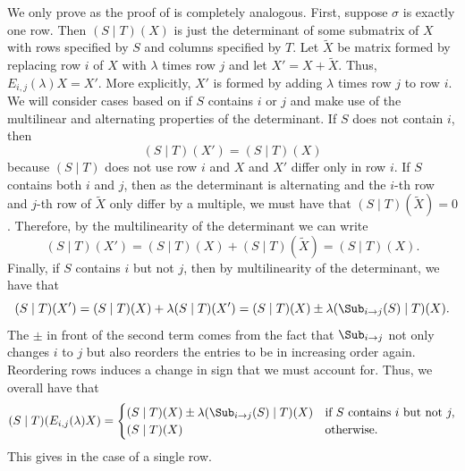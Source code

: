 \documentclass[letterpaper, 11pt]{amsart}
\begin{document}
\begin{pf}
    We only prove  as the proof of  is completely analogous.
    First, suppose $\sigma$ is exactly one row.
    Then $(S \mid T)(X)$ is just the determinant of some submatrix of $X$ with rows specified by $S$ and columns specified by $T$.
    Let $\widetilde{X}$ be matrix formed by replacing row $i$ of $X$ with $\lambda$ times row $j$ and let $X' = X + \widetilde{X}$.
    Thus, $E_{i, j}(\lambda)X = X'$.
    More explicitly, $X'$ is formed by adding $\lambda$ times row $j$ to row $i$.
    We will consider cases based on if $S$ contains $i$ or $j$ and make use of the multilinear and alternating properties of the determinant.
    If $S$ does not contain $i$, then
    \[
        (S \mid T)(X') = (S \mid T)(X)
    \]
    because $(S \mid T)$ does not use row $i$ and $X$ and $X'$ differ only in row $i$.
    If $S$ contains both $i$ and $j$, then as the determinant is alternating and the $i$-th row and $j$-th row of $\widetilde{X}$ only differ by a multiple, we must have that $(S \mid T)(\widetilde{X}) = 0$.
    Therefore, by the multilinearity of the determinant we can write
    \[
        (S \mid T)(X') = (S \mid T)(X) + (S \mid T)(\widetilde{X}) = (S \mid T)(X).
    \]
    Finally, if $S$ contains $i$ but not $j$, then by multilinearity of the determinant, we have that
    \[
        (S \mid T)(X') = (S \mid T)(X) + \lambda(S \mid T)(X') = (S \mid T)(X) \pm \lambda(\Sub_{i \to j}(S) \mid T)(X).
    \]
    The $\pm$ in front of the second term comes from the fact that $\Sub_{i \to j}$ not only changes $i$ to $j$ but also reorders the entries to be in increasing order again.
    Reordering rows induces a change in sign that we must account for.
    Thus, we overall have that
    \begin{equation}\label{eq:Eij_left_mult_cases}
        (S \mid T)(E_{i, j}(\lambda)X) = 
            \begin{cases}
                (S \mid T)(X) \pm \lambda(\Sub_{i \to j}(S) \mid T)(X) & \text{if } S \text{ contains } i \text{ but not } j, \\
                (S \mid T)(X) & \text{otherwise}.
            \end{cases}
    \end{equation}
    This gives  in the case of a single row.
    

\end{pf}
\end{document}
